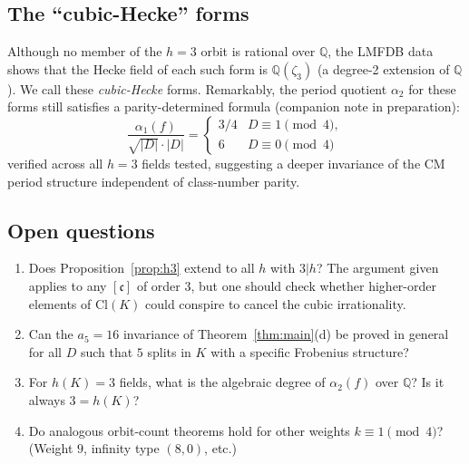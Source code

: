 \documentclass[12pt]{amsart}
\theoremstyle{definition}
\newcommand{\Q}{\mathbb{Q}}
\newcommand{\ClK}{\mathrm{Cl}(K)}
\newcommand{\alphatwo}{\alpha_2}
\begin{document}
\subsection{The ``cubic-Hecke'' forms}

Although no member of the $h = 3$ orbit is rational over $\Q$,
the LMFDB data shows that the Hecke field of each such form is $\Q(\zeta_3)$
(a degree-2 extension of $\Q$).
We call these \emph{cubic-Hecke} forms.
Remarkably, the period quotient $\alphatwo$ for these forms
still satisfies a parity-determined formula (companion note in preparation):
\[
  \frac{\alpha_1(f)}{\sqrt{|D|} \cdot |D|}
    = \begin{cases} 3/4 & D \equiv 1 \pmod 4, \\ 6 & D \equiv 0 \pmod 4 \end{cases}
\]
verified across all $h = 3$ fields tested, suggesting a deeper invariance
of the CM period structure independent of class-number parity.

\subsection{Open questions}

\begin{enumerate}
\item Does Proposition~\ref{prop:h3} extend to all $h$ with $3 | h$?
  The argument given applies to any $[\mathfrak{c}]$ of order $3$, but
  one should check whether higher-order elements of $\ClK$ could conspire
  to cancel the cubic irrationality.
\item Can the $a_5 = 16$ invariance of Theorem~\ref{thm:main}(d) be
  proved in general for all $D$ such that $5$ splits in $K$ with
  a specific Frobenius structure?
\item For $h(K) = 3$ fields, what is the algebraic degree of $\alphatwo(f)$
  over $\Q$?  Is it always $3 = h(K)$?
\item Do analogous orbit-count theorems hold for other weights $k \equiv 1 \pmod 4$?
  (Weight $9$, infinity type $(8,0)$, etc.)
\end{enumerate}

\end{document}
